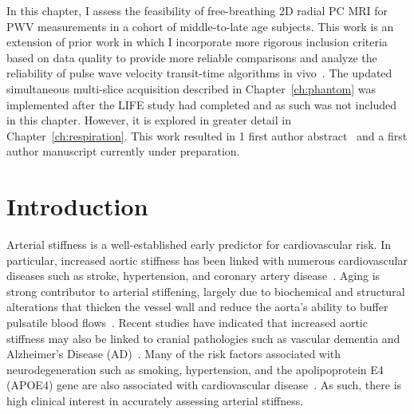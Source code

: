 In this chapter, I assess the feasibility of free-breathing 2D radial PC MRI for PWV measurements in a cohort of middle-to-late age subjects. This work is an extension of prior work in which I incorporate more rigorous inclusion criteria based on data quality to provide more reliable comparisons and analyze the reliability of pulse wave velocity transit-time algorithms in vivo~\cite{robertsAdvancingFunctionalAssessment2023}. The updated simultaneous multi-slice acquisition described in Chapter~\ref{ch:phantom} was implemented after the LIFE study had completed and as such was not included in this chapter. However, it is explored in greater detail in Chapter~\ref{ch:respiration}. This work resulted in 1 first author abstract~\cite{narenComparingRobustnessRespiratoryresolved2024} and a first author manuscript currently under preparation. 

\section{Introduction}\label{sec:life_intro}
Arterial stiffness is a well-established early predictor for cardiovascular risk. In particular, increased aortic stiffness has been linked with numerous cardiovascular diseases such as stroke, hypertension, and coronary artery disease~\cite{sutton-tyrrellElevatedAorticPulse2005}. Aging is strong contributor to arterial stiffening, largely due to biochemical and structural alterations that thicken the vessel wall and reduce the aorta's ability to buffer pulsatile blood flows~\cite{vatnerVascularStiffnessAging2021,cavalcanteAorticStiffness2011}. Recent studies have indicated that increased aortic stiffness may also be linked to cranial pathologies such as vascular dementia and Alzheimer's Disease (AD)~\cite{deroosMagneticResonanceImaging2017,batemanPulseWaveEncephalopathy2004}. Many of the risk factors associated with neurodegeneration such as smoking, hypertension, and the apolipoprotein E4 (APOE4) gene are also associated with cardiovascular disease~\cite{hughesReviewPotentialRole2015,nordestgaardSharedRiskFactors2022,angoffAorticStiffnessEpidemiology2021}. As such, there is high clinical interest in accurately assessing arterial stiffness. 

